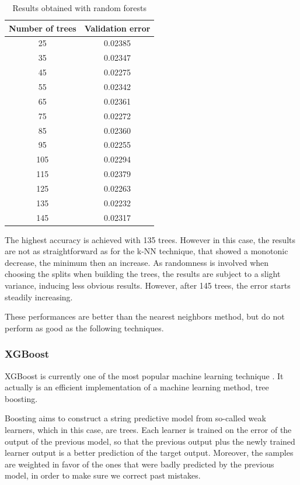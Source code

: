 \begin{table}[h]
    \centering
    \begin{tabular}{|c|c|}
        \hline
        Number of trees & Validation error \\ \hline
        25  & 0.02385 \\
        35  & 0.02347 \\
        45  & 0.02275 \\
        55  & 0.02342 \\
        65  & 0.02361 \\
        75  & 0.02272 \\
        85  & 0.02360 \\
        95  & 0.02255 \\
        105 & 0.02294 \\
        115 & 0.02379 \\
        125 & 0.02263 \\
        135 & 0.02232 \\
        145 & 0.02317 \\ \hline
    \end{tabular}
    \caption{Results obtained with random forests}
    \label{tab:trees-results}
\end{table}

The highest accuracy is achieved with 135 trees. However in this case, the results are not as straightforward as for the k-NN technique, that showed a monotonic decrease, the minimum then an increase. As randomness is involved when choosing the splits when building the trees, the results are subject to a slight variance, inducing less obvious results. However, after 145 trees, the error starts steadily increasing.

These performances are better than the nearest neighbors method, but do not perform as good as the following techniques.

\subsubsection{XGBoost}

XGBoost is currently one of the most popular machine learning technique \cite{XGBoost}. It actually is an efficient implementation of a machine learning method, tree boosting.

Boosting aims to construct a string predictive model from so-called weak learners, which in this case, are trees. Each learner is trained on the error of the output of the previous model, so that the previous output plus the newly trained learner output is a better prediction of the target output. Moreover, the samples are weighted in favor of the ones that were badly predicted by the previous model, in order to make sure we correct past mistakes.

